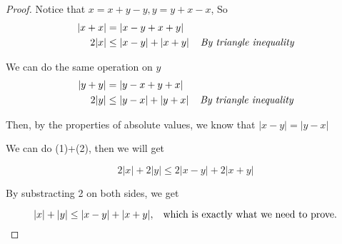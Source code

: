 \documentclass[12pt]{article}
\begin{document}
\begin{proof}
    Notice that $ x = x + y-y, y=y+x-x$, So
    \begin{align}
         \vert x + x \vert &= \vert x-y+x+y \vert \\
          2\vert x\vert & \leq \vert x-y \vert + \vert x+y \vert \hspace*{0.4cm} \textit{By triangle inequality}
    \end{align}

    We can do the same operation on $y$
    \begin{align}
        \vert y + y \vert &= \vert y-x+y+x \vert \\
         2\vert y\vert & \leq \vert y-x \vert + \vert y+x \vert \hspace*{0.4cm} \textit{By triangle inequality}
   \end{align}

   Then, by the properties of absolute values, we know that
   $ \vert x-y \vert = \vert y-x \vert $

   We can do (1)+(2), then we will get

   \[ 2\vert x \vert + 2\vert y \vert \leq
   2\vert x-y \vert + 2\vert x+y \vert \]

   By substracting 2 on both sides, we get

   \[ \vert x \vert + \vert y \vert \leq
   \vert x-y \vert + \vert x+y \vert ,\hspace*{0.3cm}
   \text{which is exactly what we need to prove.}\]


        


\end{proof}
\end{document}
